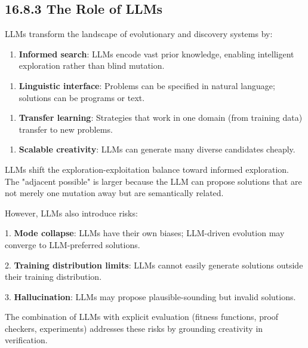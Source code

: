 \subsection{16.8.3 The Role of LLMs}

LLMs transform the landscape of evolutionary and discovery systems by:

\begin{enumerate}
\item \textbf{Informed search}: LLMs encode vast prior knowledge, enabling intelligent exploration rather than blind mutation.
\end{enumerate}

\begin{enumerate}
\item \textbf{Linguistic interface}: Problems can be specified in natural language; solutions can be programs or text.
\end{enumerate}

\begin{enumerate}
\item \textbf{Transfer learning}: Strategies that work in one domain (from training data) transfer to new problems.
\end{enumerate}

\begin{enumerate}
\item \textbf{Scalable creativity}: LLMs can generate many diverse candidates cheaply.
\end{enumerate}

\begin{proposition}
LLMs shift the exploration-exploitation balance toward informed exploration. The "adjacent possible" is larger because the LLM can propose solutions that are not merely one mutation away but are semantically related.

However, LLMs also introduce risks:

1. \textbf{Mode collapse}: LLMs have their own biases; LLM-driven evolution may converge to LLM-preferred solutions.

2. \textbf{Training distribution limits}: LLMs cannot easily generate solutions outside their training distribution.

3. \textbf{Hallucination}: LLMs may propose plausible-sounding but invalid solutions.

The combination of LLMs with explicit evaluation (fitness functions, proof checkers, experiments) addresses these risks by grounding creativity in verification.
\end{proposition}

